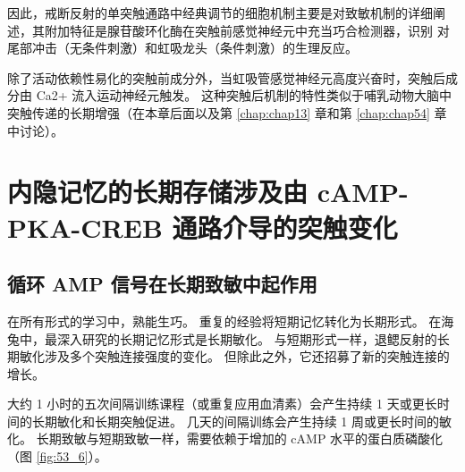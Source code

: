 因此，戒断反射的单突触通路中经典调节的细胞机制主要是对致敏机制的详细阐述，其附加特征是腺苷酸环化酶在突触前感觉神经元中充当巧合检测器，识别 对尾部冲击（无条件刺激）和虹吸龙头（条件刺激）的生理反应。


除了活动依赖性易化的突触前成分外，当虹吸管感觉神经元高度兴奋时，突触后成分由 Ca2+ 流入运动神经元触发。
这种突触后机制的特性类似于哺乳动物大脑中突触传递的长期增强（在本章后面以及第 \ref{chap:chap13} 章和第 \ref{chap:chap54} 章中讨论）。



\section{内隐记忆的长期存储涉及由 cAMP-PKA-CREB 通路介导的突触变化}

\subsection{循环 AMP 信号在长期致敏中起作用}

在所有形式的学习中，熟能生巧。
重复的经验将短期记忆转化为长期形式。
在海兔中，最深入研究的长期记忆形式是长期敏化。
与短期形式一样，退鳃反射的长期敏化涉及多个突触连接强度的变化。
但除此之外，它还招募了新的突触连接的增长。


大约 1 小时的五次间隔训练课程（或重复应用血清素）会产生持续 1 天或更长时间的长期敏化和长期突触促进。
几天的间隔训练会产生持续 1 周或更长时间的敏化。
长期致敏与短期致敏一样，需要依赖于增加的 cAMP 水平的蛋白质磷酸化（图 \ref{fig:53_6}）。


